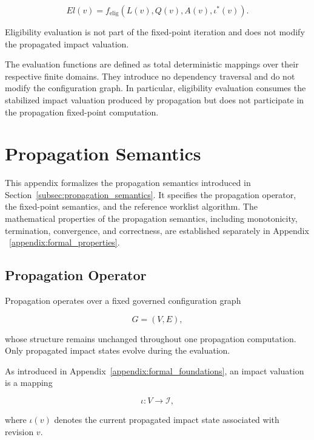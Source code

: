 \documentclass[10pt]{article}
\begin{document}
	\begin{equation}
		El(v)
		=
		f_{\mathrm{elig}}
		\left(
		L(v),
		Q(v),
		A(v),
		\iota^{*}(v)
		\right).
		\label{eq:eligibility_from_fixed_impact}
	\end{equation}
	
	Eligibility evaluation is not part of the fixed-point iteration and does not
	modify the propagated impact valuation.
	
	The evaluation functions are defined as total deterministic mappings over their
	respective finite domains. They introduce no dependency traversal and do not
	modify the configuration graph. In particular, eligibility evaluation consumes
	the stabilized impact valuation produced by propagation but does not participate
	in the propagation fixed-point computation.
	
	\section{Propagation Semantics}
	\label{appendix:propagation_semantics}
	
	This appendix formalizes the propagation semantics introduced in
	Section~\ref{subsec:propagation_semantics}. It specifies the propagation
	operator, the fixed-point semantics, and the reference worklist algorithm.
	The mathematical properties of the propagation semantics, including monotonicity,
	termination, convergence, and correctness, are established separately in
	Appendix ~\ref{appendix:formal_properties}.
	
	\subsection{Propagation Operator}
	
	Propagation operates over a fixed governed configuration graph
	
	\[
	G=(V,E),
	\]
	
	whose structure remains unchanged throughout one propagation computation.
	Only propagated impact states evolve during the evaluation.
	
	As introduced in Appendix~\ref{appendix:formal_foundations}, an impact valuation
	is a mapping
	
	\[
	\iota : V \rightarrow \mathcal{I},
	\]
	
	where $\iota(v)$ denotes the current propagated impact state associated with
	revision $v$.
	
\end{document}
